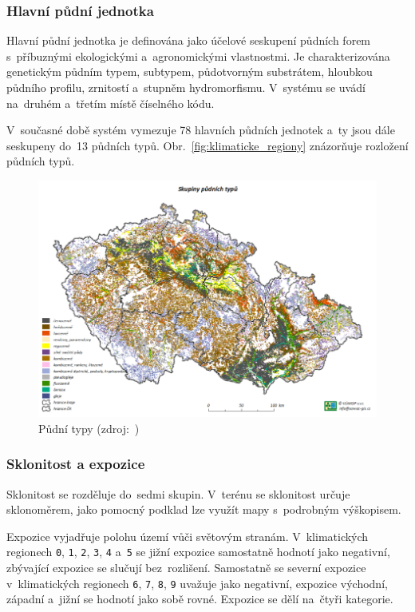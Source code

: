 \subsubsection{Hlavní půdní jednotka}
\label{hpj}

Hlavní půdní jednotka je definována jako účelové seskupení půdních
forem s~příbuz\-nými ekologickými a~agronomickými vlastnostmi. Je
charakterizována genetickým půdním typem, subtypem, půdotvorným
substrátem, hloubkou půdního profilu, zrnitostí a~stupněm
hydromorfismu. V~systému  se uvádí na~druhém a~třetím místě
číselného kódu.

V~současné době systém  vymezuje 78 hlavních půdních jednotek
a~ty jsou dále seskupeny do~13 půdních
typů. Obr.~\ref{fig:klimaticke_regiony} znázorňuje rozložení půdních
typů.

	\begin{figure}[H] \centering
		\includegraphics[width=.9\textwidth]{./pictures/pudni_typy.png}
		\caption[Půdní typy]{Půdní typy
(zdroj:~\citep{vumop_bpej})}
		\label{fig:pudni_typy}
 	\end{figure}

\subsubsection{Sklonitost a expozice}
\label{sklonitost_expozice}

Sklonitost se rozděluje do~sedmi skupin. V~terénu se sklonitost určuje
sklonoměrem, jako pomocný podklad lze využít mapy s~podrobným
výškopisem.

Expozice vyjadřuje polohu území  vůči světovým
stranám. V~klimatických regionech \texttt{0}, \texttt{1}, \texttt{2},
\texttt{3}, \texttt{4} a~\texttt{5} se jižní expozice samostatně
hodnotí jako negativní, zbývající expozice se slučují
bez~rozlišení. Samostatně se severní expozice v~klimatických regionech
\texttt{6}, \texttt{7}, \texttt{8}, \texttt{9} uvažuje jako negativní,
expozice východní, západní a~jižní se hodnotí jako sobě
rovné. Expozice se dělí na~čtyři kategorie.


